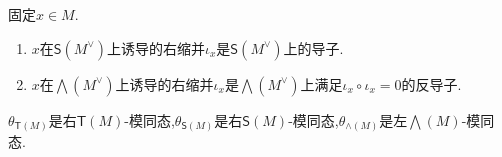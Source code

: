\begin{remark}{}{}
	固定$x\in M$.
	\begin{enumerate}
		\item $x$在$\mathsf{S}\left(M^{\vee}\right)$上诱导的右缩并$\iota_{x}$是$\mathsf{S}\left(M^{\vee}\right)$上的导子.
		\item $x$在$\bigwedge\left(M^{\vee}\right)$上诱导的右缩并$\iota_{x}$是$\bigwedge\left(M^{\vee}\right)$上满足$\iota_{x}\circ\iota_{x}=0$的反导子.
	\end{enumerate}
\end{remark}

\begin{proposition}{}{}
	$\theta_{\mathsf{T}\left(M\right)}$是右$\mathsf{T}\left(M\right)$-模同态,$\theta_{\mathsf{S}\left(M\right)}$是右$\mathsf{S}\left(M\right)$-模同态,$\theta_{\wedge\left(M\right)}$是左$\bigwedge\left(M\right)$-模同态.
\end{proposition}

















